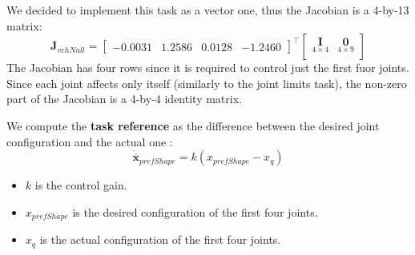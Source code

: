 \documentclass{article}
\begin{document}
We decided to implement this task as a vector one, thus the Jacobian is a 4-by-13 matrix:
\begin{equation}
\boldsymbol{J}_{vehNull}=
\begin{bmatrix}-0.0031 & 1.2586 & 0.0128 & -1.2460 \end{bmatrix}^\top
    \begin{bmatrix}
     \underset{4\times4}{\boldsymbol{I}} & \underset{4\times9}{\boldsymbol{0}} \\
    \end{bmatrix}
\end{equation}
The Jacobian has four rows since it is required to control just the first fuor joints. Since each joint affects only itself (similarly to the joint limits task), the non-zero part of the Jacobian is a 4-by-4 identity matrix. 

We compute the \textbf{task reference} as the difference between the desired joint configuration and the actual one :
\begin{equation}
   \dot{\overline{\boldsymbol{x}}}_{prefShape} = k(x_{prefShape} - x_{q}) %
\end{equation}
\begin{itemize}
    \item $k$ is the control gain.
    \item $x_{prefShape}$ is the desired configuration of the first four joints.
    \item $x_{q}$ is the actual configuration of the first four joints.
\end{itemize} 
\end{document}
